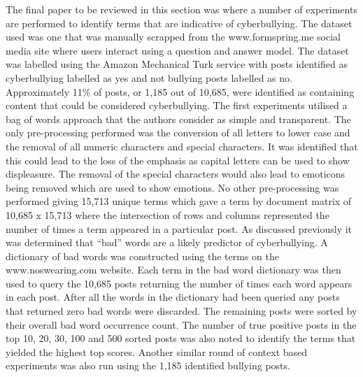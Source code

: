 The final paper to be reviewed in this section was \citet{kontostathis_detecting_2013} where a number of experiments are performed to identify terms that are indicative of cyberbullying. The dataset used was one that was manually scrapped from the www.formspring.me social media site where users interact using a question and answer model. The dataset was labelled using the Amazon Mechanical Turk service with posts identified as cyberbullying labelled as yes and not bullying posts labelled as no. Approximately 11\% of posts, or 1,185 out of 10,685, were identified as containing content that could be considered cyberbullying. The first experiments utilised a bag of words approach that the authors consider as simple and transparent. The only pre-processing performed was the conversion of all letters to lower case and the removal of all numeric characters and special characters. It was identified that this could lead to the loss of the emphasis as capital letters can be used to show displeasure. The removal of the special characters would also lead to emoticons being removed which are used to show emotions. No other pre-processing was performed giving 15,713 unique terms which gave a term by document matrix of 10,685 x 15,713 where the intersection of rows and columns represented the number of times a term appeared in a particular post. As discussed previously it was determined that ``bad'' words are a likely predictor of cyberbullying. A dictionary of bad words was constructed using the terms on the www.noswearing.com website. Each term in the bad word dictionary was then used to query the 10,685 posts returning the number of times each word appears in each post. After all the words in the dictionary had been queried any posts that returned zero bad words were discarded. The remaining posts were sorted by their overall bad word occurrence count. The number of true positive posts in the top 10, 20, 30, 100 and 500 sorted posts was also noted to identify the terms that yielded the highest top  scores. Another similar round of context based experiments was also run using the 1,185 identified bullying posts. 

